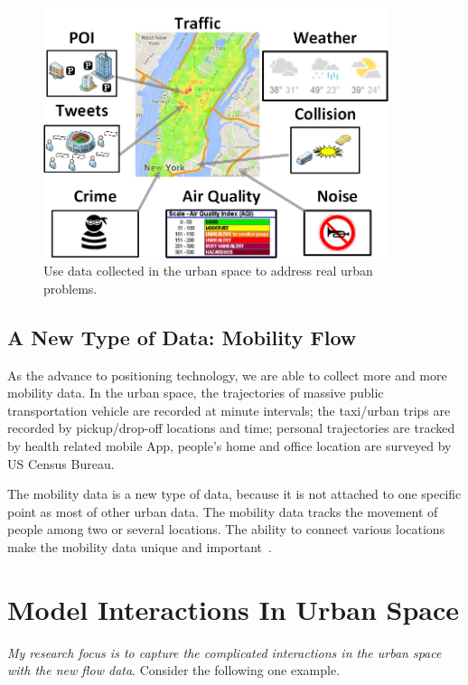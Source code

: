 \begin{figure}[h]
\centering
\includegraphics[width=0.9\textwidth]{fig/intro-data.png}
\caption{Use data collected in the urban space to address real urban problems.}
\label{fig:demo-data}
\end{figure}




\subsection{A New Type of Data: Mobility Flow}


As the advance to positioning technology, we are able to collect more and more mobility data.
In the urban space, the trajectories of massive public transportation vehicle are recorded at minute intervals; the taxi/urban trips are recorded by pickup/drop-off locations and time; personal trajectories are tracked by health related mobile App, people's home and office location are surveyed by US Census Bureau.


The mobility data is a new type of data, because it is not attached to one specific point as most of other urban data.
The mobility data tracks the movement of people among two or several locations. The ability to connect various locations make the mobility data unique and important~\cite{ZCWY14}.




\section{Model Interactions In Urban Space}

\emph{My research focus is to capture the complicated interactions in the urban space with the new flow data}. Consider the following one example.


